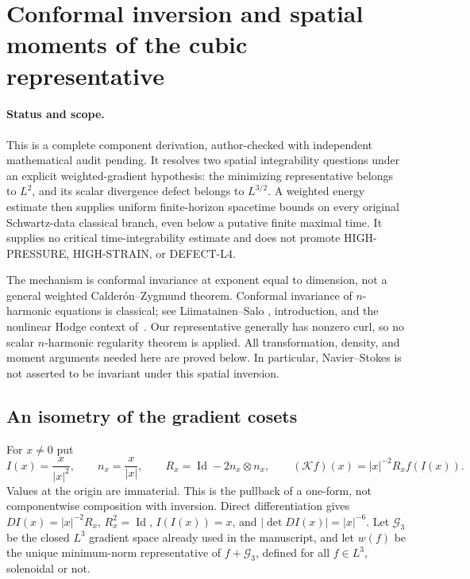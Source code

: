 \section{Conformal inversion and spatial moments of the cubic representative}
\label{cm:section}

\paragraph{Status and scope.}
This is a complete component derivation, author-checked with independent
mathematical audit pending. It resolves two spatial integrability questions
under an explicit weighted-gradient hypothesis: the minimizing representative
belongs to $L^2$, and its scalar divergence defect belongs to $L^{3/2}$.
A weighted energy estimate then supplies uniform finite-horizon spacetime
bounds on every original Schwartz-data classical branch, even below a
putative finite maximal time. It supplies no critical time-integrability
estimate and does not promote HIGH-PRESSURE, HIGH-STRAIN, or DEFECT-L4.

The mechanism is conformal invariance at exponent equal to dimension,
not a general weighted Calder\'on--Zygmund theorem. Conformal invariance
of $n$-harmonic equations is classical; see Liimatainen--Salo
\cite{LiimatainenSalo2014}, introduction, and the nonlinear Hodge context
of~\cite{IwaniecScottStroffolini1999}. Our representative generally has
nonzero curl, so no scalar $n$-harmonic regularity theorem is applied.
All transformation, density, and moment arguments needed here are proved
below. In particular, Navier--Stokes is not asserted to be invariant under
this spatial inversion.

\subsection{An isometry of the gradient cosets}

For $x\ne0$ put
\[
 I(x)=\frac{x}{|x|^2},\qquad n_x=\frac{x}{|x|},\qquad
 R_x=\operatorname{Id}-2n_x\otimes n_x,\qquad
 (\mathcal Kf)(x)=|x|^{-2}R_x f(I(x)).
\]
Values at the origin are immaterial. This is the pullback of a one-form,
not componentwise composition with inversion. Direct differentiation gives
$DI(x)=|x|^{-2}R_x$, $R_x^2=\operatorname{Id}$,
$I(I(x))=x$, and $|\det DI(x)|=|x|^{-6}$.
Let $\mathcal G_3$ be the closed $L^3$ gradient space already used in the
manuscript, and let $w(f)$ be the unique minimum-norm representative of
$f+\mathcal G_3$, defined for all $f\in L^3$, solenoidal or not.

